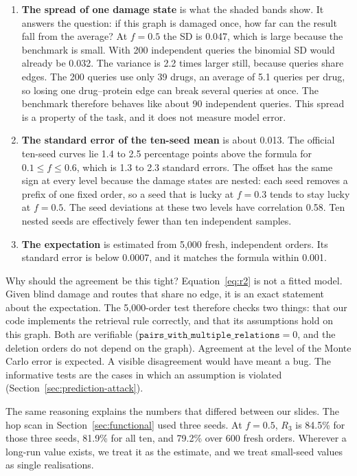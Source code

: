 \begin{enumerate}[leftmargin=*,itemsep=3pt]
\item \textbf{The spread of one damage state} is what the shaded bands show. It
answers the question: if this graph is damaged once, how far can the result
fall from the average? At $f=0.5$ the SD is 0.047, which is large because the
benchmark is small. With 200 independent queries the binomial SD would already
be 0.032. The variance is 2.2 times larger still, because queries share edges.
The 200 queries use only 39 drugs, an average of 5.1 queries per drug, so losing
one drug--protein edge can break several queries at once. The benchmark
therefore behaves like about 90 independent queries. This spread is a property
of the task, and it does not measure model error.
\item \textbf{The standard error of the ten-seed mean} is about 0.013. The
official ten-seed curves lie 1.4 to 2.5 percentage points above the formula for
$0.1\le f\le0.6$, which is 1.3 to 2.3 standard errors. The offset has the same
sign at every level because the damage states are nested: each seed removes a
prefix of one fixed order, so a seed that is lucky at $f=0.3$ tends to stay
lucky at $f=0.5$. The seed deviations at these two levels have correlation
0.58. Ten nested seeds are effectively fewer than ten independent samples.
\item \textbf{The expectation} is estimated from 5,000 fresh, independent
orders. Its standard error is below 0.0007, and it matches the formula within
0.001.
\end{enumerate}

Why should the agreement be this tight? Equation~\eqref{eq:r2} is not a fitted
model. Given blind damage and routes that share no edge, it is an exact
statement about the expectation. The 5,000-order test therefore checks two
things: that our code implements the retrieval rule correctly, and that its
assumptions hold on this graph. Both are verifiable ($\texttt{pairs\_with\_multiple\_relations}=0$,
and the deletion orders do not depend on the graph). Agreement at the level of
the Monte Carlo error is expected. A visible disagreement would have meant a
bug. The informative tests are the cases in which an assumption is violated
(Section~\ref{sec:prediction-attack}).

The same reasoning explains the numbers that differed between our slides. The
hop scan in Section~\ref{sec:functional} used three seeds. At $f=0.5$, $R_3$ is
84.5\% for those three seeds, 81.9\% for all ten, and 79.2\% over 600 fresh
orders. Wherever a long-run value exists, we treat it as the estimate, and we
treat small-seed values as single realisations.


